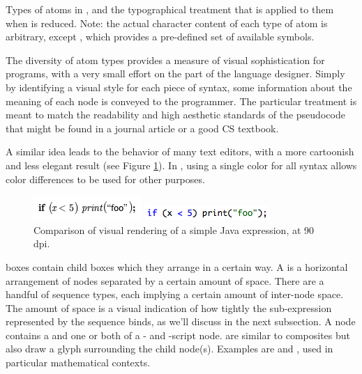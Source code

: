 \begin{table}
\vspace{6pt}

\caption{Types of atoms in , and the typographical treatment that is applied to them when  is reduced. Note: the actual character content of each type of atom is arbitrary, except , which provides a pre-defined set of available symbols.}
\label{fig-atoms}
\end{table}

The diversity of atom types provides a measure of visual sophistication for programs, with a very small effort on the part of the language designer. Simply by identifying a visual style for each piece of syntax, some information about the meaning of each node is conveyed to the programmer. The particular treatment is meant to match the readability and high aesthetic standards of the pseudocode that might be found in a journal article or a good CS textbook.

A similar idea leads to the  behavior of many text editors, with a more cartoonish and less elegant result (see Figure \ref{fig-syntax-coloring}). In \Meta, using a single color for all syntax allows color differences to be used for other purposes.

\begin{figure}[ht]
  \includegraphics[scale=0.8]{src/image/if.png}
  
  \includegraphics[scale=0.8]{src/image/if-text.png}

  \caption{\label{fig-syntax-coloring}Comparison of visual rendering of a simple Java expression, at 90 dpi. }
\end{figure}

 boxes contain child boxes which they arrange in a certain way. A  is a horizontal arrangement of nodes separated by a certain amount of space. There are a handful of sequence types, each implying a certain amount of inter-node space. The amount of space is a visual indication of how tightly the sub-expression represented by the sequence binds, as we'll discuss in the next subsection. A  node contains a  and one or both of a - and -script node.  are similar to composites but also draw a glyph surrounding the child node(s). Examples are  and , used in particular mathematical contexts.

